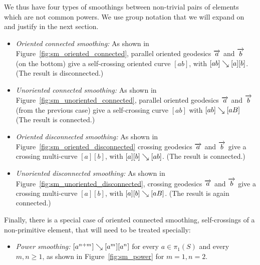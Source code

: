 \begin{definition}
  We thus have four types 
  of smoothings between non-trivial pairs of elements which are not
  common powers. We use group notation that we will expand on and justify
  in the next section.
  \begin{itemize}
  \item \emph{Oriented connected smoothing:} As shown in
    Figure~\ref{fig:sm_oriented_connected},
    parallel oriented geodesics
    $\overrightarrow{a}$ and $\overrightarrow{b}$ (on the bottom) give a self-crossing oriented
    curve $[ab]$, with $[ab] \mathrel{\searrow} [a][b]$. (The result is
    disconnected.)
  \item \emph{Unoriented connected smoothing:}
    As shown in
    Figure~\ref{fig:sm_unoriented_connected}, parallel oriented geodesics
    $\overrightarrow{a}$ and $\overrightarrow{b}$ (from the previous case) give a
    self-crossing curve $[ab]$ with
    $[ab] \mathrel{\searrow} [aB]$ (The result is
    connected.)
  \item \emph{Oriented disconnected smoothing:} As shown in
    Figure~\ref{fig:sm_oriented_disconnected}
 crossing geodesics $\overrightarrow{a}$ and $\overrightarrow{b}$ give a crossing
 multi-curve $[a][b]$, with $[a][b] \mathrel{\searrow} [ab]$. (The result is connected.)
  \item \emph{Unoriented disconnected smoothing:} As shown in
    Figure~\ref{fig:sm_unoriented_disconnected}, crossing geodesics
    $\overrightarrow{a}$ and $\overrightarrow{b}$ give a crossing multi-curve
    $[a][b]$, with $[a][b] \mathrel{\searrow} [aB]$. (The result is again connected.)
  \end{itemize}
  Finally, there is a special case of oriented connected smoothing,
  self-crossings of a non-primitive element, that will need to be treated
  specially:
  \begin{itemize}
  \item \emph{Power smoothing:}
    $[a^{n+m}] \mathrel{\searrow} [a^m][a^n]$ for every $a \in \pi_1(S)$ and every
    $m,n \geq 1$, as shown in Figure~\ref{fig:sm_power} for $m=1,n=2$.
  \end{itemize}
\end{definition}


